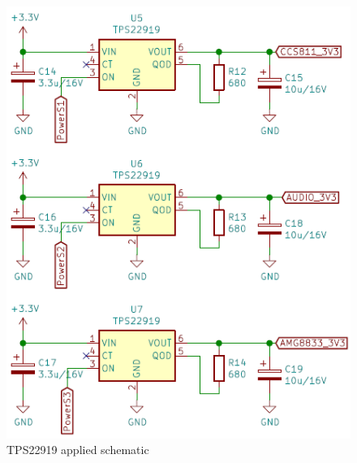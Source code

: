 \documentclass[11pt,a4paper]{article}
\begin{document}
\begin{figure}[H]
	\centering
	\includegraphics[width=0.8\linewidth]{TPS22919_toegepast.png}
	\caption{TPS22919 applied schematic}
	\label{fig:TPS22919_toegepast}
\end{figure}
\end{document}
